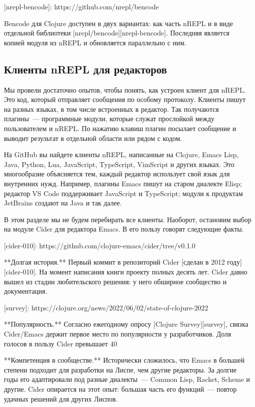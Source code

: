 [nrepl-bencode]: https://github.com/nrepl/bencode

Bencode для Clojure доступен в двух вариантах: как часть nREPL и в виде отдельной библиотеки [nrepl/bencode][nrepl-bencode]. Последняя является копией модуля из nREPL и обновляется параллельно с ним.

\subsection{Клиенты nREPL для редакторов}

Мы провели достаточно опытов, чтобы понять, как устроен клиент для nREPL. Это код, который отправляет сообщения по особому протоколу. Клиенты пишут на разных языках, в том числе встроенных в редактор. Так получаются плагины~--- программные модули, которые служат прослойкой между пользователем и nREPL. По нажатию клавиш плагин посылает сообщение и выводит результат в отдельной области или рядом с кодом.

На GitHub вы найдете клиенты nREPL, написанные на Clojure, Emacs Lisp, Java, Python, Lua, JavaScript, TypeScript, VimScript и других языках. Это многообразие объясняется тем, каждый редактор использует свой язык для внутренних нужд. Например, плагины Emacs пишут на старом диалекте Elisp; редактор VS Code поддерживает JavaScript и TypeScript; модули к продуктам JetBrains создают на Java и так далее.

В этом разделе мы не будем перебирать все клиенты. Наоборот, остановим выбор на модуле Cider для редактора Emacs. В его пользу говорят следующие факты.

[cider-010]: https://github.com/clojure-emacs/cider/tree/v0.1.0

**Долгая история.** Первый коммит в репозиторий Cider [сделан в 2012 году][cider-010]. На момент написания книги проекту полных десять лет. Cider давно вышел из стадии любительского решения: у него обширное сообщество и документация.

[survey]: https://clojure.org/news/2022/06/02/state-of-clojure-2022

**Популярность.** Согласно ежегодному опросу [Clojure Survey][survey], связка Cider/Emacs держит первое место по популярности у разработчиков. Доля голосов в пользу Cider превышает 40%

**Компетенция в сообществе.** Исторически сложилось, что Emacs в большей степени подходит для разработки на Лиспе, чем другие редакторы. За долгие годы его адаптировали под разные диалекты~--- Common Lisp, Racket, Scheme и другие. Cider опирается на этот опыт: большая часть его функций~--- повтор удачных решений для других Лиспов.

